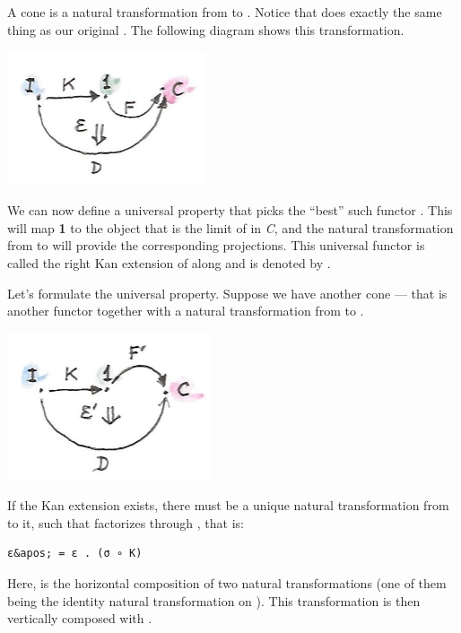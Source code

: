 A cone is a natural transformation  from  to
. Notice that  does exactly the same thing as
our original . The following diagram shows this
transformation.

\includegraphics[width=2.31250in]{images/kan3-e1492120491591.jpg}

We can now define a universal property that picks the ``best'' such
functor . This  will map \textbf{1} to the object
that is the limit of  in \emph{C}, and the natural
transformation  from  to  will
provide the corresponding projections. This universal functor is called
the right Kan extension of  along  and is denoted by
.

Let's formulate the universal property. Suppose we have another cone ---
that is another functor  together with a natural
transformation  from  to
.

\includegraphics[width=2.36458in]{images/kan31-e1492120512209.jpg}

If the Kan extension  exists, there must be a unique
natural transformation  from  to it, such
that  factorizes through , that is:

\begin{verbatim}
ε&apos; = ε . (σ ∘ K)
\end{verbatim}

Here,  is the horizontal composition of two natural
transformations (one of them being the identity natural transformation
on ). This transformation is then vertically composed with
.

